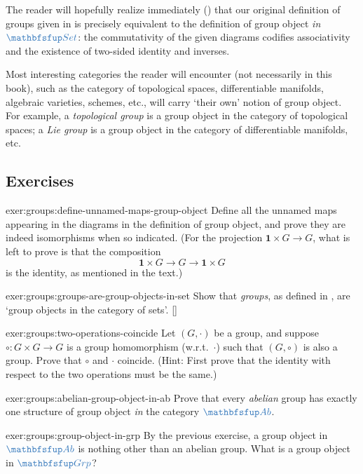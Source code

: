 The reader will hopefully realize immediately
() that our original
definition of groups given in 
is precisely equivalent to the definition of group object \emph{in}
$\categ{Set}$: the commutativity of the given diagrams codifies
associativity and the existence of two-sided identity and inverses.

Most interesting categories the reader will encounter (not necessarily
in this book), such as the category of topological spaces,
differentiable manifolds, algebraic varieties, schemes, etc., will
carry `their own' notion of group object. For example, a
\emph{topological group} is a group object in the category of
topological spaces; a \emph{Lie group} is a group object in the
category of differentiable manifolds, etc.

\subsection*{Exercises}

\begin{exer}{}{exer:groups:define-unnamed-maps-group-object}
  Define all the unnamed maps appearing in the diagrams in the
  definition of group object, and prove they are indeed isomorphisms
  when so indicated. (For the projection $\mathbf{1} \times G \to G$,
  what is left to prove is that the composition
  \[
    \mathbf{1} \times G \to G \to \mathbf{1} \times G
  \]
  is the identity, as mentioned in the text.)
\end{exer}
\begin{exer}{\exerused}{exer:groups:groups-are-group-objects-in-set}
  Show that \emph{groups}, as defined in
  , are `group objects in the
  category of sets'. []
\end{exer}
\begin{exer}{}{exer:groups:two-operations-coincide}
  Let $(G, \cdot)$ be a group, and suppose $\circ : G \times G \to G$
  is a group homomorphism (w.r.t.\ $\cdot$) such that $(G, \circ)$ is
  also a group. Prove that $\circ$ and $\cdot$ coincide. (Hint: First
  prove that the identity with respect to the two operations must be
  the same.)
\end{exer}
\begin{exer}{}{exer:groups:abelian-group-object-in-ab}
  Prove that every \emph{abelian} group has exactly one structure of
  group object \emph{in} the category $\categ{Ab}$.
\end{exer}
\begin{exer}{}{exer:groups:group-object-in-grp}
  By the previous exercise, a group object in $\categ{Ab}$ is nothing
  other than an abelian group. What is a group object in
  $\categ{Grp}$?
\end{exer}

